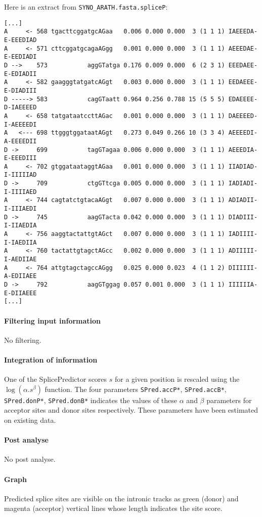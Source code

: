 Here is an extract from \texttt{SYNO\_ARATH.fasta.spliceP}:
\begin{Verbatim}[fontsize=\small]
[...]
A     <- 568 tgacttcggatgcAGaa   0.006 0.000 0.000  3 (1 1 1) IAEEEDA-E-EEEDIAD
A     <- 571 cttcggatgcagaAGgg   0.001 0.000 0.000  3 (1 1 1) AEEEDAE-E-EEDIADI
D -->    573           aggGTatga 0.176 0.009 0.000  6 (2 3 1) EEEDAEE-E-EDIADII
A     <- 582 gaagggtatgatcAGgt   0.003 0.000 0.000  3 (1 1 1) EEDAEEE-E-DIADIII
D -----> 583           cagGTaatt 0.964 0.256 0.788 15 (5 5 5) EDAEEEE-D-IAEEEED
A     <- 658 tatgataatccttAGac   0.001 0.000 0.000  3 (1 1 1) DAEEEED-I-AEEEEDI
A   <--- 698 ttgggtggataatAGgt   0.273 0.049 0.266 10 (3 3 4) AEEEEDI-A-EEEEDII
D ->     699           tagGTagaa 0.006 0.000 0.000  3 (1 1 1) AEEEDIA-E-EEEDIII
A     <- 702 gtggataataggtAGaa   0.001 0.000 0.000  3 (1 1 1) IIADIAD-I-IIIIIAD
D ->     709           ctgGTtcga 0.005 0.000 0.000  3 (1 1 1) IADIADI-I-IIIIAED
A     <- 744 cagtatctgtacaAGgt   0.007 0.000 0.000  3 (1 1 1) ADIADII-I-IIIAEDI
D ->     745           aagGTacta 0.042 0.000 0.000  3 (1 1 1) DIADIII-I-IIAEDIA
A     <- 756 aaggtactattgtAGct   0.007 0.000 0.000  3 (1 1 1) IADIIII-I-IAEDIIA
A     <- 760 tactattgtagctAGcc   0.002 0.000 0.000  3 (1 1 1) ADIIIII-I-AEDIIAE
A     <- 764 attgtagctagccAGgg   0.025 0.000 0.023  4 (1 1 2) DIIIIII-A-EDIIAEE
D ->     792           aagGTggag 0.057 0.001 0.000  3 (1 1 1) IIIIIIA-E-DIIAEEE
[...]
\end{Verbatim}

\paragraph{Filtering input information}

No filtering.

\paragraph{Integration of information}

One of the SplicePredictor scores $s$ for a given position is
rescaled using the $\log(\alpha.s^\beta)$ function. The four parameters
\texttt{SPred.accP*}, \texttt{SPred.accB*}, \texttt{SPred.donP*},
\texttt{SPred.donB*} indicates the values of these $\alpha$ and $\beta$
parameters for acceptor sites and donor sites respectively.  These
parameters have been estimated on existing data.

\paragraph{Post analyse}

No post analyse.

\paragraph{Graph}

Predicted splice sites are visible on the intronic tracks as green
(donor) and magenta (acceptor) vertical lines whose length indicates
the site score.
